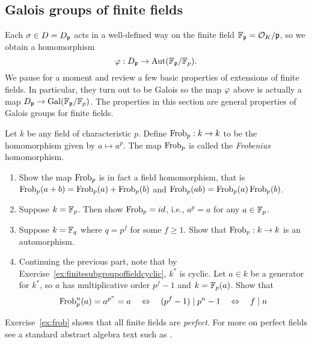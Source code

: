 \subsection{Galois groups of finite fields}\label{sec:galoisfinite}

Each $\sigma \in D = D_{\mathfrak{p}}$ acts in a well-defined
way on the finite field $\mathbb{F}_{\mathfrak{p}} = \mathcal{O}_K/\mathfrak{p}$, so we obtain
a homomorphism
$$
	\varphi:D_{\mathfrak{p}} \to \operatorname{Aut}(\mathbb{F}_{\mathfrak{p}}/\mathbb{F}_p).
$$
We pause for a moment and review a few basic properties of
extensions of finite fields. In particular, they turn out
to be Galois so the map $\varphi$ above is actually a map
$D_{\mathfrak{p}} \to \operatorname{Gal}(\mathbb{F}_{\mathfrak{p}}/\mathbb{F}_p)$.
The properties in this section are general properties
of Galois groups for finite fields.

\begin{definition}
	Let $k$ be any field of characteristic $p$.
	Define $\operatorname{Frob}_p:k\to k$ to be the homomorphism
	given by $a\mapsto a^p$. The map $\operatorname{Frob}_p$ is
	called the \emph{Frobenius} homomorphism.
\end{definition}

\begin{exercise}\label{ex:frob}
	\hfill
	\begin{enumerate}
		\item
		Show the map $\operatorname{Frob}_p$ is in fact a field homomorphism,
		that is $\operatorname{Frob}_p(a + b) = \operatorname{Frob}_p(a) + \operatorname{Frob}_p(b)$
		and $\operatorname{Frob}_p(ab) = \operatorname{Frob}_p(a)\operatorname{Frob}_p(b)$.

		\item
		Suppose $k = \mathbb{F}_p$. Then show $\operatorname{Frob}_p = id$, i.e.,
		$a^p = a$ for any $a\in\mathbb{F}_p$.

		\item
		Suppose $k = \mathbb{F}_{q}$ where $q=p^f$ for some $f\geq 1$.
		Show that $\operatorname{Frob}_p:k\to k$ is an automorphism.

		\item
		Continuing the previous part, note that by
		Exercise~\ref{ex:finitesubgroupoffieldcyclic}, $k^*$ is cyclic.
		Let $a\in k$ be a generator for $k^*$,
		so $a$ has multiplicative order $p^f-1$ and $k = \mathbb{F}_p(a)$.
		Show that
		$$
			\operatorname{Frob}_p^n(a) = a^{p^n} = a
			\quad\Leftrightarrow\quad (p^f - 1) \mid p^n - 1
			\quad\Leftrightarrow\quad f \mid n
		$$
	\end{enumerate}
\end{exercise}

\begin{remark}
	Exercise~\ref{ex:frob} shows that all finite fields
	are \emph{perfect}. For more on perfect fields see
	a standard abstract algebra text such as
	\cite{dummit2004abstract}.
\end{remark}

